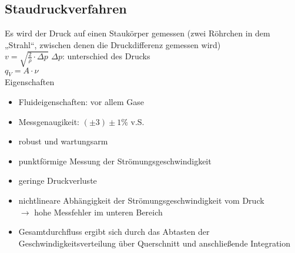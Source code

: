 \subsection{Staudruckverfahren}
Es wird der Druck auf einen Staukörper gemessen (zwei Röhrchen in dem „Strahl“, zwischen denen die Druckdifferenz gemessen wird)\\
$v=\sqrt{\frac{2}{\rho}\cdot \Delta p}$ \qquad $\Delta p$: unterschied des Drucks\\
$q_V = A \cdot \nu$\\
Eigenschaften
\begin{itemize}
\item Fluideigenschaften: vor allem Gase
\item Messgenaugikeit: $(\pm 3) \pm 1 \%$ v.S.
\end{itemize}
\begin{itemize}[label=$+$]
\item robust und wartungsarm
\item punktförmige Messung der Strömungsgeschwindigkeit
\item geringe Druckverluste
\end{itemize}

\begin{itemize}[label=$-$]
\item nichtlineare Abhängigkeit der Strömungsgeschwindigkeit vom Druck\\
$\to$ hohe Messfehler im unteren Bereich
\item Gesamtdurchfluss ergibt sich durch das Abtasten der Geschwindigkeitsverteilung über Querschnitt und anschließende Integration
\end{itemize}

